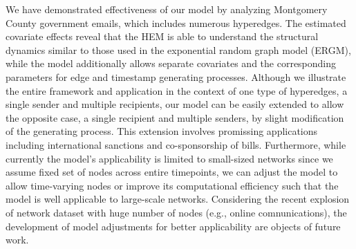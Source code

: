 \documentclass[12pt]{article}
\begin{document}
We have demonstrated effectiveness of our model by analyzing Montgomery County government emails, which includes numerous hyperedges. The estimated covariate effects reveal that the HEM is able to understand the structural dynamics similar to those used in the exponential random graph model (ERGM), while the model additionally allows separate covariates and the corresponding parameters for edge and timestamp generating processes. Although we illustrate the entire framework and application in the context
of one type of hyperedges, a single sender and multiple recipients, our model can be easily extended to allow the opposite case, a single recipient and multiple senders, by slight modification of the generating process. This extension involves promissing applications including international sanctions and co-sponsorship of bills. Furthermore, while currently the model's applicability is limited to small-sized networks since we assume fixed set of nodes across entire timepoints, we can adjust the model to allow time-varying nodes or improve its computational efficiency such that the model is well applicable to large-scale networks. Considering the recent explosion of network dataset with huge number of nodes (e.g., online comnunications), the development of model adjustments for better applicability are objects of future work.


\end{document}
